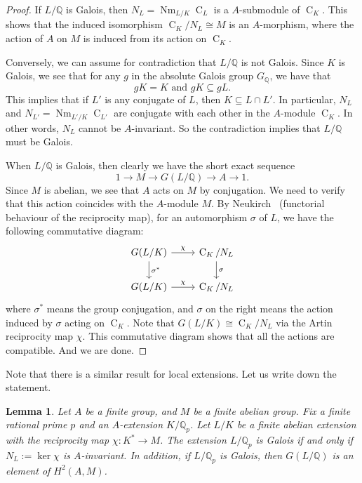 \documentclass{amsart}
\numberwithin{equation}{section}
\theoremstyle{plain}
\newtheorem{lemma}[theorem]{Lemma}
\theoremstyle{definition}
\theoremstyle{remark}
\begin{document}
\begin{proof}
	If $L/\mathbb{Q}$ is Galois, then $N_L=\operatorname{Nm}_{L/K}\operatorname{C}_L$ is a $A$-submodule of $\operatorname{C}_K$.
	This shows that the induced isomorphism $\operatorname{C}_K/N_L\cong M$ is an $A$-morphism, where the action of $A$ on $M$ is induced from its action on $\operatorname{C}_K$.
	
	Conversely, we can assume for contradiction that $L/\mathbb{Q}$ is not Galois.
	Since $K$ is Galois, we see that for any $g$ in the absolute Galois group $G_{\mathbb{Q}}$, we have that
	\begin{equation*}
		gK=K\text{ and }gK\subseteq gL.
	\end{equation*}
	This implies that if $L'$ is any conjugate of $L$, then $K\subseteq L\cap L'$.
	In particular, $N_L$ and $N_{L'}=\operatorname{Nm}_{L'/K}\operatorname{C}_{L'}$ are conjugate with each other in the $A$-module $\operatorname{C}_K$.
	In other words, $N_L$ cannot be $A$-invariant.
	So the contradiction implies that $L/\mathbb{Q}$ must be Galois.
	
	When $L/\mathbb{Q}$ is Galois, then clearly we have the short exact sequence
	\begin{equation*}
		1\to M\to G(L/\mathbb{Q})\to A\to1.
	\end{equation*}
	Since $M$ is abelian, we see that $A$ acts on $M$ by conjugation.
	We need to verify that this action coincides with the $A$-module $M$.
	By Neukirch~\cite[IV.5.8]{neukirch2013algebraic} (functorial behaviour of the reciprocity map), for an automorphism $\sigma$ of $L$, we have the following commutative diagram:
	\begin{equation*}
		\begin{tikzcd}
			G(L/K)\arrow[d,"\sigma^*"]\arrow[r,"\chi"]&\operatorname{C}_K/N_L\arrow[d,"\sigma"]\\
			G(L/K)\arrow[r,"\chi"]&\operatorname{C}_K/N_L
		\end{tikzcd}
	\end{equation*}
	where $\sigma^*$ means the group conjugation, and $\sigma$ on the right means the action induced by $\sigma$ acting on $\operatorname{C}_K$. 
	Note that $G(L/K)\cong\operatorname{C}_K/N_L$ via the Artin reciprocity map $\chi$.
	This commutative diagram shows that all the actions are compatible.
	And we are done.
\end{proof}
Note that there is a similar result for local extensions.
Let us write down the statement.
\begin{lemma}\label{lemma: CFT galois action on idele local case}
	Let $A$ be a finite group, and $M$ be a finite abelian group.
    Fix a finite rational prime $p$ and an $A$-extension $K/\mathbb{Q}_p$.
	Let $L/K$ be a finite abelian extension with the reciprocity map $\chi:K^*\to M$.
	The extension $L/\mathbb{Q}_p$ is Galois if and only if $N_L:=\ker\chi$ is $A$-invariant.
	In addition, if $L/\mathbb{Q}_p$ is Galois, then $G(L/\mathbb{Q})$ is an element of $H^2(A,M)$.
\end{lemma}
\end{document}
